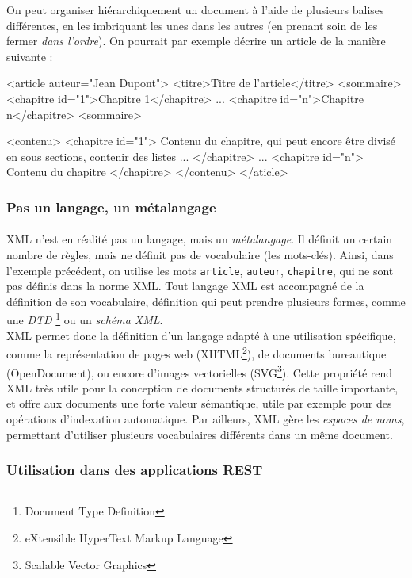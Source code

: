\documentclass[a4paper,11pt]{article}
\begin{document}
On peut organiser hiérarchiquement un document à l'aide de plusieurs balises différentes, en les imbriquant les unes dans les autres (en prenant soin de les fermer \emph{dans l'ordre}). On pourrait par exemple décrire un article de la manière suivante : 

\begin{verbatimtab}[4]
	<article auteur="Jean Dupont">
		<titre>Titre de l'article</titre>
		<sommaire>
			<chapitre id="1">Chapitre 1</chapitre>
			...
			<chapitre id="n">Chapitre n</chapitre>
		<sommaire>

		<contenu>
			<chapitre id="1">
				Contenu du chapitre, qui peut encore être divisé en sous sections,
				contenir des listes ...
			</chapitre>
			...
			<chapitre id="n">
				Contenu du chapitre
			</chapitre>
		</contenu>
	</aticle>
\end{verbatimtab}

\subsubsection{Pas un langage, un métalangage}
	\paragraph{}
	XML n'est en réalité pas un langage, mais un \emph{métalangage}. Il définit un certain nombre de règles, mais ne définit pas de vocabulaire (les mots-clés). Ainsi, dans l'exemple précédent, on utilise les mots \texttt{article}, \texttt{auteur}, \texttt{chapitre}, qui ne sont pas définis dans la norme XML. Tout langage XML est accompagné de la définition de son vocabulaire, définition qui peut prendre plusieurs formes, comme une \emph{DTD} \footnote{Document Type Definition} ou un \emph{schéma XML}.\\
	XML permet donc la définition d'un langage adapté à une utilisation spécifique, comme la représentation de pages web (XHTML\footnote{eXtensible HyperText Markup Language}), de documents bureautique (OpenDocument), ou encore d'images vectorielles (SVG\footnote{Scalable Vector Graphics}).
	Cette propriété rend XML très utile pour la conception de documents structurés de taille importante, et offre aux documents une forte valeur sémantique, utile par exemple pour des opérations d'indexation automatique. Par ailleurs, XML gère les \emph{espaces de noms}, permettant d'utiliser plusieurs vocabulaires différents dans un même document.


\subsubsection{Utilisation dans des applications REST}
\end{document}
